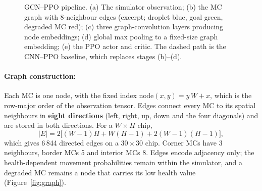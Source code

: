 \documentclass[11pt,a4paper]{article}
\begin{document}
\begin{figure}[H]
{}
\caption{GCN--PPO pipeline. (a) The simulator observation; (b) the MC graph
  with 8-neighbour edges (excerpt; droplet blue, goal green, degraded MC red);
  (c) three graph-convolution layers producing node embeddings; (d) global max
  pooling to a fixed-size graph embedding; (e) the PPO actor and critic. The
  dashed path is the CNN--PPO baseline, which replaces stages (b)--(d).}
\label{fig:pipeline}
\end{figure}

\paragraph{Graph construction:}
Each MC is one node, with the fixed index $\mathrm{node}(x,y)=y\,W+x$, which
is the row-major order of the observation tensor. Edges connect every MC to
its spatial neighbours in \textbf{eight directions} (left, right, up, down
and the four diagonals) and are stored in both directions. For a
$W\times H$ chip,
\begin{equation}
|E| = 2\big[(W-1)H + W(H-1) + 2(W-1)(H-1)\big],
\end{equation}
which gives 6\,844 directed edges on a $30\times30$ chip. Corner MCs have 3
neighbours, border MCs 5 and interior MCs 8. Edges encode adjacency only; the
health-dependent movement probabilities remain within the simulator, and a
degraded MC remains a node that carries its low health value
(Figure~\ref{fig:graph}).
\end{document}
